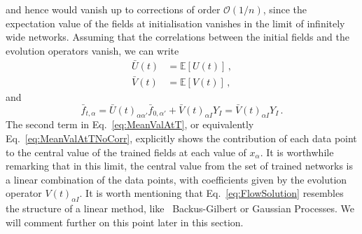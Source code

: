 and hence would vanish up to corrections of order
$\mathcal{O}(1/n)$, since the expectation value of the fields at initialisation
vanishes in the limit of infinitely wide networks. Assuming that the
correlations between the initial fields and the evolution operators vanish, we
can write
\begin{align}
    \label{eq:MeanUt}
    \bar{U}(t)
        &= \mathbb{E}\left[U(t)\right]\, , \\
    \label{eq:MeanVt}
    \bar{V}(t)
        &= \mathbb{E}\left[V(t)\right]\, ,
\end{align}
and
\begin{equation}
    \label{eq:MeanValAtTNoCorr}
    \bar{f}_{t,\alpha} = \bar{U}(t)_{\alpha\alpha'} \bar{f}_{0,\alpha'}
        + \bar{V}(t)_{\alpha I} Y_I = \bar{V}(t)_{\alpha I} Y_I \, .
\end{equation}
The second term in Eq.~\eqref{eq:MeanValAtT}, or equivalently
Eq.~\eqref{eq:MeanValAtTNoCorr}, explicitly shows the contribution of each data
point to the central value of the trained fields at each value of $x_{\alpha}$.
It is worthwhile remarking that in this limit, the central value from the set of
trained networks is a linear combination of the data points, with coefficients
given by the evolution operator $V(t)_{\alpha I}$. It is worth mentioning that
Eq.~\eqref{eq:FlowSolution} resembles the structure of a linear method,
like \eg\ Backus-Gilbert or Gaussian Processes. We will comment further on this
point later in this section.


